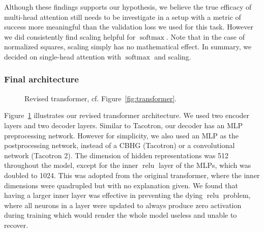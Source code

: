 \documentclass[11pt]{article}
\DeclareMathOperator{\softmax}{softmax}
\DeclareMathOperator{\relu}{relu}
\begin{document}
Although these findings supports our hypothesis,
we believe the true efficacy of multi-head attention still needs to be investigate in a setup
with a metric of success more meaningful than the validation loss we used for this task.
However we did consistently find scaling helpful for \(\softmax\).
Note that in the case of normalized squares, scaling simply has no mathematical effect.
In summary, we decided on single-head attention with \(\softmax\) and scaling.

\subsubsection*{Final architecture}

\begin{figure}
  \centering
  \caption[]{\label{fig:arch}Revised transformer, cf. Figure~\ref{fig:transformer}.}
\end{figure}

Figure~\ref{fig:arch} illustrates our revised transformer architecture.
We used two encoder layers and two decoder layers.
Similar to Tacotron, our decoder has an MLP preprocessing network.
However for simplicity, we also used an MLP as the postprocessing network,
instead of a CBHG (Tacotron) or a convolutional network (Tacotron 2).
The dimension of hidden representations was 512 throughout the model,
except for the inner \(\relu\) layer of the MLPs,
which was doubled to 1024.
This was adopted from the original transformer,
where the inner dimensions were quadrupled but with no explanation given.
We found that having a larger inner layer was effective in preventing the dying \(\relu\) problem,
where all neurons in a layer were updated to always produce zero activation during training
which would render the whole model useless and unable to recover.
\end{document}
